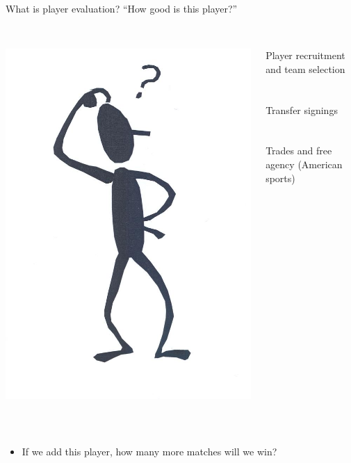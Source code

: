\documentclass[handout]{beamer}
\begin{document}
\begin{frame}{What is player evaluation?}
  ``How good is this player?''\\
  ~\\
  \begin{columns}
    \begin{column}{0.3\textwidth}
      \centering
      \includegraphics[width = \textwidth]{images/stickman_thinking.jpg}
    \end{column}
    \begin{column}{0.7\textwidth}
      Player recruitment and team selection\\
      ~\\
      ~\\
      Transfer signings\\
      ~\\
      ~\\
      Trades and free agency (American sports)
    \end{column}
  \end{columns}
  ~\\
  \begin{itemize}
    \item If we add this player, how many more matches will we win?
  \end{itemize}
\end{frame}
\end{document}
